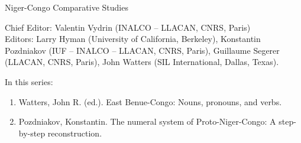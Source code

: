 {\large Niger-Congo Comparative Studies}

\bigskip

Chief Editor:  Valentin Vydrin (INALCO – LLACAN, CNRS, Paris) \\
Editors:      
    Larry Hyman (University of California, Berkeley),
    Konstantin Pozdniakov (IUF – INALCO – LLACAN, CNRS, Paris),
    Guillaume Segerer (LLACAN, CNRS, Paris),
    John Watters (SIL International, Dallas, Texas).


\bigskip

In this series:

\begin{enumerate}
\item Watters, John R. (ed.). East Benue-Congo: Nouns, pronouns, and verbs.
\item Pozdniakov, Konstantin. The numeral system of Proto-Niger-Congo: A step-by-step reconstruction.
\end{enumerate}

 
